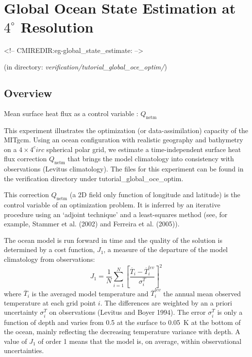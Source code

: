 
\section[Global Ocean State Estimation Example]{Global Ocean State Estimation at $4^\circ$ Resolution}
\label{www:tutorials}
\label{sect:eg-global_state_estimate}
\begin{rawhtml}
<!-- CMIREDIR:eg-global_state_estimate: -->
\end{rawhtml}
\begin{center}
(in directory: {\it verification/tutorial\_global\_oce\_optim/})
\end{center}

\subsection{Overview}

Mean surface heat flux as a  control variable : $Q_\mathrm{netm}$

This experiment illustrates the optimization (or data-assimilation) capacity
of the MITgcm. Using an ocean configuration with realistic geography and bathymetry on a
$4\times4^circ$ spherical polar grid, we estimate a time-independent surface heat flux correction
$Q_\mathrm{netm}$ that brings the model climatology into consistency with observations (Levitus
climatology). The files for this experiment can be found in the verification directory under
tutorial\_global\_oce\_optim.

This correction $Q_\mathrm{netm}$ (a 2D field only function of longitude and latitude) is
the control variable of an optimization problem. It is inferred by an iterative
procedure using an `adjoint technique' and a least-squares method (see, for example, 
Stammer et al. (2002) and Ferreira et al. (2005)).

The ocean model is run forward in time and the quality of the solution is
determined by a cost function, $J_1$, a measure of the departure of the model
climatology from observations:
\begin{equation}
J_1=\frac{1}{N}\sum_{i=1}^N \left[ \frac{\overline{T}_i-\overline{T}_i^{lev}}{\sigma_i^T}\right]^2
\end{equation}
where $\overline{T}_i$ is the averaged model temperature and $\overline{T}_i^{lev}$
the annual mean observed temperature at each grid point $i$. The differences
are weighted by an a priori uncertainty $\sigma_i^T$ on observations (Levitus
and Boyer 1994). The error $\sigma_i^T$ is only a function of depth and varies
from 0.5 at the surface to 0.05~K at the bottom of the ocean, mainly reflecting
the decreasing temperature variance with depth. A value of $J_1$ of order 1 means
that the model is, on average, within observational uncertainties.

